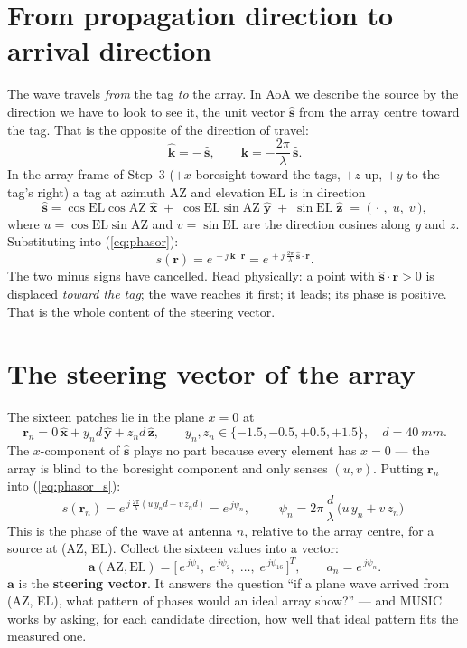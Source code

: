 \documentclass[11pt,a4paper]{article}
\newcommand{\vect}[1]{\mathbf{#1}}
\newcommand{\uv}[1]{\hat{\mathbf{#1}}}
\begin{document}
\section{From propagation direction to arrival direction}
The wave travels \emph{from} the tag \emph{to} the array. In AoA we describe the source by the direction we have to look to see it, the unit vector $\uv s$ from the array centre toward the tag. That is the opposite of the direction of travel:
\[
  \uv k = -\,\uv s, \qquad \vect k = -\frac{2\pi}{\lambda}\,\uv s .
\]
In the array frame of Step~3 ($+x$ boresight toward the tags, $+z$ up, $+y$ to the tag's right) a tag at azimuth AZ and elevation EL is in direction
\begin{equation}
  \uv s = \cos\mathrm{EL}\cos\mathrm{AZ}\;\uv x \;+\; \cos\mathrm{EL}\sin\mathrm{AZ}\;\uv y \;+\; \sin\mathrm{EL}\;\uv z
        \;=\; \big(\,\cdot\,,\; u,\; v\,\big),
  \label{eq:s}
\end{equation}
where $u = \cos\mathrm{EL}\sin\mathrm{AZ}$ and $v = \sin\mathrm{EL}$ are the direction cosines along $y$ and $z$. Substituting into (\ref{eq:phasor}):
\begin{equation}
  s(\vect r) = e^{\,-j\,\vect k\cdot\vect r} = e^{\,+j\,\frac{2\pi}{\lambda}\,\uv s\cdot\vect r} .
  \label{eq:phasor_s}
\end{equation}
The two minus signs have cancelled. Read physically: a point with $\uv s\cdot\vect r > 0$ is displaced \emph{toward the tag}; the wave reaches it first; it leads; its phase is positive. That is the whole content of the steering vector.

\section{The steering vector of the array}
The sixteen patches lie in the plane $x = 0$ at
\[
  \vect r_n = 0\,\uv x + y_n d\,\uv y + z_n d\,\uv z ,
  \qquad y_n, z_n \in \{-1.5, -0.5, +0.5, +1.5\}, \quad d = \SI{40}{mm}.
\]
The $x$-component of $\uv s$ plays no part because every element has $x = 0$ --- the array is blind to the boresight component and only senses $(u, v)$. Putting $\vect r_n$ into (\ref{eq:phasor_s}):
\begin{equation}
  s(\vect r_n) = e^{\,j\,\frac{2\pi}{\lambda}\left(u\,y_n d + v\,z_n d\right)}
              = e^{\,j\psi_n},
  \qquad
  \boxed{\;\psi_n = 2\pi\,\frac{d}{\lambda}\,\big(u\,y_n + v\,z_n\big)\;}
  \label{eq:psi}
\end{equation}
This is the phase of the wave at antenna $n$, relative to the array centre, for a source at (AZ, EL). Collect the sixteen values into a vector:
\[
  \vect a(\mathrm{AZ}, \mathrm{EL}) = \big[\,e^{\,j\psi_1},\; e^{\,j\psi_2},\; \dots,\; e^{\,j\psi_{16}}\,\big]^T,
  \qquad a_n = e^{\,j\psi_n}.
\]
$\vect a$ is the \textbf{steering vector}. It answers the question ``if a plane wave arrived from (AZ, EL), what pattern of phases would an ideal array show?'' --- and MUSIC works by asking, for each candidate direction, how well that ideal pattern fits the measured one.
\end{document}
